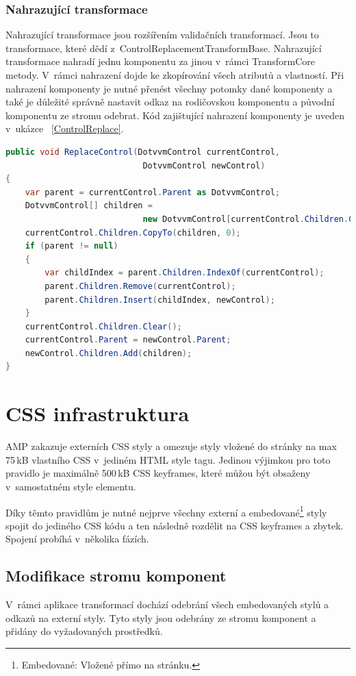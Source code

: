 \subsubsection{Nahrazující transformace}
    Nahrazující transformace jsou rozšířením validačních transformací. Jsou to transformace, které dědí z~ControlReplacementTransformBase. Nahrazující transformace nahradí jednu komponentu za jinou v~rámci TransformCore metody. V~rámci nahrazení dojde ke zkopírování všech atributů a vlastností. Při nahrazení komponenty je nutné přenést všechny potomky dané komponenty a také je důležité správně nastavit odkaz na rodičovskou komponentu a původní komponentu ze stromu odebrat. Kód zajištující nahrazení komponenty je uveden v~ukázce ~\ref{ControlReplace}.
    \pagebreak
    \begin{lstlisting}[language=c#, caption= Nahrazení jedné DotVVM komponenty za jinou. ,label=ControlReplace,captionpos=t]
public void ReplaceControl(DotvvmControl currentControl,
                            DotvvmControl newControl)
{
    var parent = currentControl.Parent as DotvvmControl;
    DotvvmControl[] children =
                            new DotvvmControl[currentControl.Children.Count];
    currentControl.Children.CopyTo(children, 0);
    if (parent != null)
    {
        var childIndex = parent.Children.IndexOf(currentControl);
        parent.Children.Remove(currentControl);
        parent.Children.Insert(childIndex, newControl);
    }
    currentControl.Children.Clear();
    currentControl.Parent = newControl.Parent;
    newControl.Children.Add(children);
}

\end{lstlisting}

\section{CSS infrastruktura}
AMP zakazuje externích CSS styly a omezuje styly vložené do stránky na max 75\,kB vlastního CSS v~jediném HTML style tagu. Jedinou výjimkou pro toto pravidlo je maximálně 500\,kB CSS keyframes, které můžou být obsaženy v~samostatném style elementu.

Díky těmto pravidlům je nutné nejprve všechny externí a embedované\footnote{Embedované: Vložené přímo na stránku.} styly spojit do jediného CSS kódu a ten následně rozdělit na CSS keyframes a zbytek. Spojení probíhá v~několika fázích.
\subsection*{Modifikace stromu komponent}
V~rámci aplikace transformací dochází odebrání všech embedovaných stylů a odkazů na externí styly. Tyto styly jsou odebrány ze stromu komponent a přidány do vyžadovaných prostředků.

